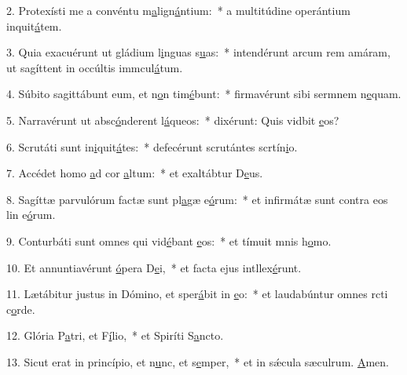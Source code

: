 2. Protexísti me a convéntu m\uline{a}lign\uline{á}ntium:~* a multitúdine operántium inquit\uline{á}tem.\par 
3. Quia exacuérunt ut gládium l\uline{i}nguas s\uline{u}as:~* intendérunt arcum rem amáram, ut sagíttent in occúltis immcul\uline{á}tum.\par 
4. Súbito sagittábunt eum, et n\uline{o}n tim\uline{é}bunt:~* firmavérunt sibi sermnem n\uline{e}quam.\par 
5. Narravérunt ut absc\uline{ó}nderent l\uline{á}queos:~* dixérunt: Quis vidbit \uline{e}os?\par 
6. Scrutáti sunt in\uline{i}quit\uline{á}tes:~* defecérunt scrutántes scrtín\uline{i}o.\par 
7. Accédet homo \uline{a}d cor \uline{a}ltum:~* et exaltábtur D\uline{e}us.\par 
8. Sagíttæ parvulórum factæ sunt pl\uline{a}gæ e\uline{ó}rum:~* et infirmátæ sunt contra eos lin e\uline{ó}rum.\par 
9. Conturbáti sunt omnes qui vid\uline{é}bant \uline{e}os:~* et tímuit mnis h\uline{o}mo.\par 
10. Et annuntiavérunt \uline{ó}pera D\uline{e}i,~* et facta ejus intllex\uline{é}runt.\par 
11. Lætábitur justus in Dómino, et sper\uline{á}bit in \uline{e}o:~* et laudabúntur omnes rcti c\uline{o}rde.\par 
12. Glória P\uline{a}tri, et F\uline{í}lio,~* et Spiríti S\uline{a}ncto.\par 
13. Sicut erat in princípio, et n\uline{u}nc, et s\uline{e}mper,~* et in sǽcula sæculrum. \uline{A}men.\par 
